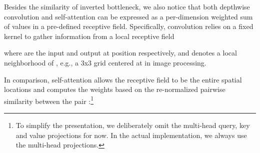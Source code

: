 \documentclass{article}
\begin{document}
Besides the similarity of inverted bottleneck, we also notice that both depthwise convolution and self-attention can be expressed as a per-dimension weighted sum of values in a pre-defined receptive field.
Specifically, convolution relies on a fixed kernel to gather information from a local receptive field

where  are the input and output at position  respectively, and  denotes a local neighborhood of , e.g., a 3x3 grid centered at  in image processing.

In comparison, self-attention allows the receptive field to be the entire spatial locations and computes the weights based on the re-normalized pairwise similarity between the pair :\footnote{To simplify the presentation, we deliberately omit the multi-head query, key and value projections for now. In the actual implementation, we always use the multi-head projections.}
\end{document}
